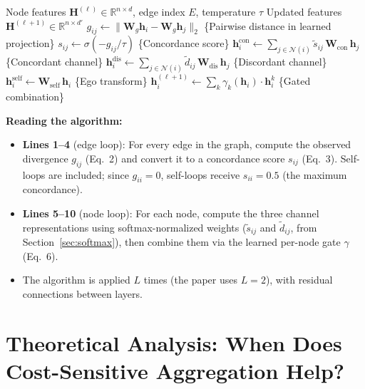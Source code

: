 \documentclass[11pt,a4paper]{article}
\newcommand{\R}{\mathbb{R}}
\newcommand{\N}{\mathcal{N}}
\newcommand{\bW}{\mathbf{W}}
\newcommand{\bh}{\mathbf{h}}
\theoremstyle{definition}
\theoremstyle{plain}
\begin{document}
\begin{algorithm}[h]
\caption{CSNA Layer (Lite Version)}
\begin{algorithmic}[1]
\REQUIRE Node features $\mathbf{H}^{(\ell)} \in \R^{n \times d}$, edge index $E$, temperature $\tau$
\ENSURE Updated features $\mathbf{H}^{(\ell+1)} \in \R^{n \times d'}$
  \STATE $g_{ij} \leftarrow \|\bW_g \bh_i - \bW_g \bh_j\|_2$ \hfill \{Pairwise distance in learned projection\}
  \STATE $s_{ij} \leftarrow \sigma(-g_{ij}/\tau)$ \hfill \{Concordance score\}
\ENDFOR
{}
  \STATE $\bh_i^{\text{con}} \leftarrow \sum_{j \in \N(i)} \tilde{s}_{ij}\, \bW_{\text{con}}\, \bh_j$ \hfill \{Concordant channel\}
  \STATE $\bh_i^{\text{dis}} \leftarrow \sum_{j \in \N(i)} \tilde{d}_{ij}\, \bW_{\text{dis}}\, \bh_j$ \hfill \{Discordant channel\}
  \STATE $\bh_i^{\text{self}} \leftarrow \bW_{\text{self}}\, \bh_i$ \hfill \{Ego transform\}
  \STATE $\bh_i^{(\ell+1)} \leftarrow \sum_k \gamma_k(\bh_i) \cdot \bh_i^k$ \hfill \{Gated combination\}
\ENDFOR
\end{algorithmic}
\end{algorithm}

\textbf{Reading the algorithm:}
\begin{itemize}
  \item \textbf{Lines 1--4} (edge loop): For every edge in the graph, compute the
    observed divergence $g_{ij}$ (Eq.~2) and convert it to a concordance score
    $s_{ij}$ (Eq.~3). Self-loops are included; since $g_{ii} = 0$, self-loops
    receive $s_{ii} = 0.5$ (the maximum concordance).
  \item \textbf{Lines 5--10} (node loop): For each node, compute the three channel
    representations using softmax-normalized weights
    ($\tilde{s}_{ij}$ and $\tilde{d}_{ij}$, from Section~\ref{sec:softmax}),
    then combine them via the learned per-node gate $\gamma$ (Eq.~6).
  \item The algorithm is applied $L$ times (the paper uses $L=2$), with residual
    connections between layers.
\end{itemize}


\section{Theoretical Analysis: When Does Cost-Sensitive Aggregation Help?}
\label{sec:theory}
\end{document}
